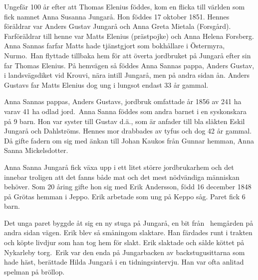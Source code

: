 
Ungefär 100 år efter att Thomas Elenius föddes, kom en flicka till världen som fick namnet Anna Susanna Jungarå. Hon föddes 17 oktober 1851. Hennes föräldrar var Anders Gustav Jungarå och Anna Greta Mietala (Forsgård). Farföräldrar till henne var Matts Elenius (prästpojke) och Anna Helena Forsberg. Anna Sannas farfar Matts hade tjänstgjort som bokhållare i Östermyra, Nurmo. Han flyttade tillbaka hem för att överta jordbruket på Jungarå efter sin far Thomas Elenius. På hemvägen så föddes Anna Sannas pappa, Anders Gustav, i landsvägsdiket vid Krouvi, nära intill Jungarå, men på andra sidan ån. Anders Gustavs far Matts Elenius dog ung i lungsot endast 33 år gammal.

Anna Sannas pappas, Anders Gustavs, jordbruk omfattade år 1856 av 241 ha varav 41 ha odlad jord. Anna Sanna föddes som andra barnet i en syskonskara på 9 barn. Hon var syster till Gustav d.ä., som är anfader till bla släkten Eskil Jungarå och Dahlströms. Hennes mor drabbades av tyfus och dog 42 år gammal. Då gifte fadern om sig med änkan till Johan Kaukos från Gunnar hemman, Anna Sanna Mickelsdotter.

Anna Sanna Jungarå fick växa upp i ett litet större jordbrukarhem och det innebar troligen att det fanns både mat och det mest nödvändiga människan behöver. Som 20 åring gifte hon sig med Erik Andersson, född 16 december 1848 på Grötas hemman i Jeppo. Erik arbetade som ung på Keppo såg. Paret fick 6 barn.
\begin{jhchildren}
  \item {}
  \item {}
  \item {}
  \item {}
  \item {}
  \item {}
\end{jhchildren}
Det unga paret byggde åt sig en ny stuga på Jungarå, en bit från  hemgården på andra sidan vägen. Erik blev så småningom slaktare. Han färdades runt i trakten och köpte livdjur som han tog hem för slakt. Erik slaktade och sålde köttet på Nykarleby torg. Erik var den enda på Jungarbacken av backstugusittarna som hade häst, berättade Hilda Jungarå i en tidningsintervju. Han var ofta anlitad spelman på bröllop.

